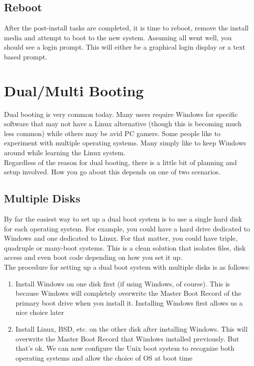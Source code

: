 \subsection{Reboot}

After the post-install tasks are completed, it is time to reboot, remove the install media and attempt to boot to the new system.  Assuming all went well, you should see a login prompt.  This will either be a graphical login display or a text based prompt.

\section{Dual/Multi Booting}

Dual booting is very common today.  Many users require Windows for specific software that may not have a Linux alternative (though this is becoming much less common) while others may be avid PC gamers.  Some people like to experiment with multiple operating systems.  Many simply like to keep Windows around while learning the Linux system.\\

Regardless of the reason for dual booting, there is a little bit of planning and setup involved.  How you go about this depends on one of two scenarios.

\subsection{Multiple Disks}

By far the easiest way to set up a dual boot system is to use a single hard disk for each operating system.  For example, you could have a hard drive dedicated to Windows and one dedicated to Linux.  For that matter, you could have triple, quadruple or many-boot systems.  This is a clean solution that isolates files, disk access and even boot code depending on how you set it up.\\

The procedure for setting up a dual boot system with multiple disks is as follows:

\begin{enumerate}

\item
Install Windows on one disk first (if using Windows, of course). This is because Windows will completely overwrite the Master Boot Record of the primary boot drive when you install it.  Installing Windows first allows us a nice choice later

\item
Install Linux, BSD, etc. on the other disk after installing Windows.  This will overwrite the Master Boot Record that Windows installed previously.  But that's ok.  We can now configure the Unix boot system to recognize both operating systems and allow the choice of OS at boot time

\end{enumerate}

